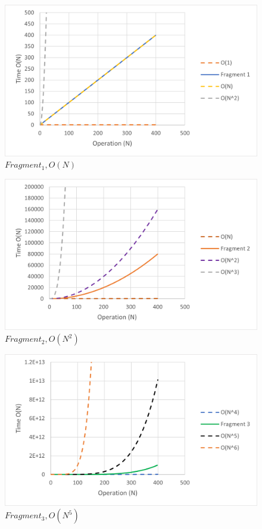 \documentclass[journal]{IEEEtran}
\begin{document}
 \begin{figure}[h!]
	\includegraphics[scale = 0.7]{Picture1.PNG}
	\caption{$Fragment_1, O(N)$}
\end{figure}

\begin{figure}[h!]
	\includegraphics[scale = 0.7]{Picture2.PNG}
	\caption{$Fragment_2, O(N^2)$}
\end{figure}

\begin{figure}[h!]
	\includegraphics[scale = 0.7]{Picture3.PNG}
	\caption{$Fragment_3, O(N^5)$}
\end{figure}
\end{document}

